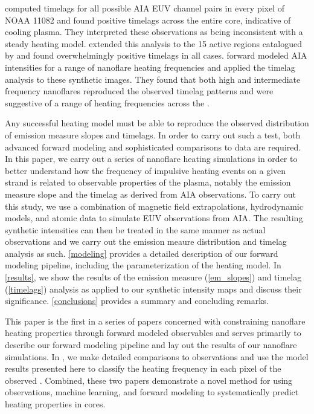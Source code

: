 \citeauthor{viall_evidence_2012} computed timelags for all possible AIA EUV channel pairs in every pixel of \AR{} NOAA 11082 and found positive timelags across the entire \AR{} core, indicative of cooling plasma. They interpreted these observations as being inconsistent with a steady heating model. \citet{viall_survey_2017} extended this analysis to the 15 active regions catalogued by \citet{warren_systematic_2012} and found overwhelmingly positive timelags in all cases. \citet{bradshaw_patterns_2016} forward modeled AIA intensities for a range of nanoflare heating frequencies and applied the timelag analysis to these synthetic images. They found that both high and intermediate frequency nanoflares reproduced the observed timelag patterns and were suggestive of a range of heating frequencies across the \AR{}.

Any successful heating model must be able to reproduce the observed distribution of emission measure slopes and timelags. In order to carry out such a test, both advanced forward modeling and sophisticated comparisons to data are required. In this paper, we carry out a series of nanoflare heating simulations in order to better understand how the frequency of impulsive heating events on a given strand is related to observable properties of the plasma, notably the emission measure slope and the timelag as derived from AIA observations. To carry out this study, we use a combination of magnetic field extrapolations, hydrodynamic models, and atomic data to simulate EUV observations from AIA. The resulting synthetic intensities can then be treated in the same manner as actual observations and we carry out the emission meaure distribution and timelag analysis as such. \autoref{modeling} provides a detailed description of our forward modeling pipeline, including the parameterization of the heating model. In \autoref{results}, we show the results of the emission measure (\autoref{em_slopes}) and timelag (\autoref{timelags}) analysis as applied to our synthetic intensity maps and discuss their significance. \autoref{conclusions} provides a summary and concluding remarks.

This paper is the first in a series of papers concerned with constraining nanoflare heating properties through forward modeled observables and serves primarily to describe our forward modeling pipeline and lay out the results of our nanoflare simulations. In \citet[ hereafter]{barnes_understanding_2018-1}, we make detailed comparisons to observations and use the model results presented here to classify the heating frequency in each pixel of the observed \AR{}. Combined, these two papers demonstrate a novel method for using observations, machine learning, and forward modeling to systematically predict heating properties in \AR{} cores.
